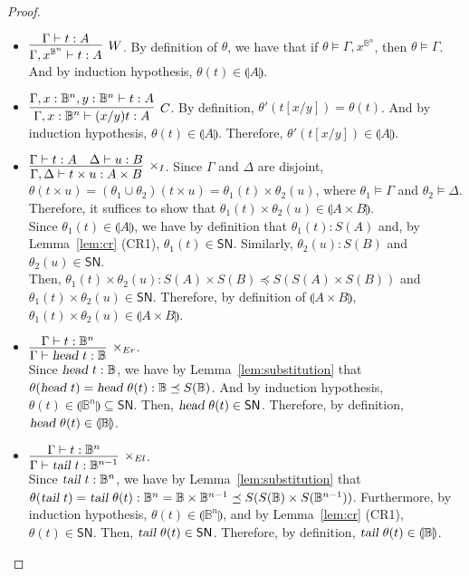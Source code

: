 \documentclass[preprint]{elsarticle}
\newcommand\interp[1]{\llparenthesis #1\rrparenthesis}
\newcommand\SN{\mathsf{SN}}
\newcommand\B{\ensuremath{\mathbb B}}
\newcommand\head{\text{\sl head}}
\newcommand\tail{\text{\sl tail}}
\newcommand{\vrbl}[2]{#1^{#2}}
\begin{document}
\begin{proof}
\begin{itemize}
  \item \( \vcenter{\infer[W]{\Gamma, x^{\B^n} \vdash t : A}{\Gamma \vdash t: A}}
    \). By definition of \( \theta \), we have that if \( \theta \models \Gamma, \vrbl{x}{\B^n} \), then \( \theta \models \Gamma \). And by induction hypothesis, \( \theta(t) \in \interp{A} \).

  \item $\vcenter{\infer[C]{\Gamma, x : \B^n \vdash (x/y) t : A}{\Gamma, x : \B^n,
        y : \B^n \vdash t : A}}$. By definition, \( \theta'(t[x/y]) = \theta(t) \). And by induction hypothesis, \( \theta(t) \in \interp{A} \). Therefore, \( \theta'(t[x/y]) \in \interp{A} \).

  \item $\vcenter{\infer[\times_I]{\Gamma, \Delta \vdash t \times u : A \times B}{\Gamma \vdash t : A & \Delta \vdash u : B}}$.
    Since \( \Gamma \) and \( \Delta \) are disjoint, \( \theta(t \times u) = (\theta_1 \cup \theta_2)(t \times u) = \theta_1(t) \times \theta_2(u) \), where \( \theta_1 \models \Gamma \) and \( \theta_2 \models \Delta \).
    Therefore, it suffices to show that \( \theta_1(t) \times \theta_2(u) \in \interp{A \times B} \).
    \\ Since \( \theta_1(t) \in \interp{A} \), we have by definition that \( \theta_1(t) : S(A) \) and, by Lemma~\ref{lem:cr} (CR1), \( \theta_1(t) \in \SN \). Similarly, \( \theta_2(u) : S(B) \) and \( \theta_2(u) \in \SN \).
    \\ Then, \( \theta_1(t) \times \theta_2(u) : S(A) \times S(B) \preceq S(S(A) \times S(B)) \) and \( \theta_1(t) \times \theta_2(u) \in \SN \). Therefore, by definition of \( \interp{A \times B} \), \( \theta_1(t) \times \theta_2(u) \in \interp{A \times B} \).

  \item $\vcenter{\infer[\times_{Er}]{\Gamma \vdash \head\ t : \B}{\Gamma \vdash
        t : \B^n}}$.
    \\ Since \( \head\ t : \B \), we have by Lemma~\ref{lem:substitution} that \( \theta(\head\ t) = \head\ \theta(t) : \B \preceq S(\B) \). And by induction hypothesis, \( \theta(t) \in \interp{\B^n} \subseteq \SN \). Then, \( \head\ \theta(t) \in \SN \). Therefore, by definition, \( \head\ \theta(t) \in \interp{\B} \).

  \item $\vcenter{\infer[\times_{El}]{\Gamma \vdash \tail\ t : \B^{n-1}}{\Gamma \vdash
        t : \B^n}}$.
    \\ Since \( \tail\ t : \B^n \), we have by Lemma~\ref{lem:substitution} that \( \theta(\tail\ t) = \tail\ \theta(t) : \B^n = \B \times \B^{n - 1} \preceq S(S(\B) \times S(\B^{n - 1})) \). Furthermore, by induction hypothesis, \( \theta(t) \in \interp{\B^n} \), and by Lemma~\ref{lem:cr} (CR1), \( \theta(t) \in \SN \). Then, \( \tail\ \theta(t) \in \SN \). Therefore, by definition, \( \tail\ \theta(t) \in \interp{\B} \).


\end{itemize}
\end{proof}
\end{document}
